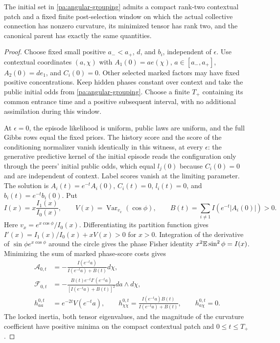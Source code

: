 The initial set in \cref{pa:angular-grouping} admits a compact rank-two contextual patch and a fixed finite post-selection window on which the actual collective connection has nonzero curvature, its minimized tensor has rank two, and the canonical parent has exactly the same quantities.
\begin{proof}
Choose fixed small positive $a_-<a_+$, $d$, and $b_i$, independent of $\epsilon$. Use contextual coordinates $(a,\chi)$ with
$A_1(0)=a e(\chi)$, $a\in[a_-,a_+]$, $A_2(0)=d e_1$, and $C_i(0)=0$.
Other selected marked factors may have fixed positive concentrations. Keep hidden phases constant over context and take the public initial odds from \cref{pa:angular-grouping}. Choose a finite $T_+$ containing its common entrance time and a positive subsequent interval, with no additional assimilation during this window.

At $\epsilon=0$, the episode likelihood is uniform, public laws are uniform, and the full Gibbs rows equal the fixed priors. The history score and the score of the conditioning normalizer vanish identically in this witness, at every $\epsilon$: the generative predictive kernel of the initial episode reads the configuration only through the peers' initial public odds, which equal $l_j(0)$ because $C_i(0)=0$ and are independent of context. Label scores vanish at the limiting parameter. The solution is $A_i(t)=e^{-t}A_i(0)$, $C_i(t)=0$, $l_i(t)=0$, and $b_i(t)=e^{-t}b_i(0)$. Put
\begin{equation}
 I(x)=x\frac{I_1(x)}{I_0(x)},\qquad
 V(x)=\operatorname{Var}_{v_x}(\cos\phi),\qquad
 B(t)=\sum_{i\ne1}I(e^{-t}|A_i(0)|)>0.
 \label{pa:inertias}
\end{equation}
Here $v_x=e^{x\cos\phi}/I_0(x)$. Differentiating its partition function gives $I'(x)=I_1(x)/I_0(x)+xV(x)>0$ for $x>0$. Integration of the derivative of $\sin\phi e^{x\cos\phi}$ around the circle gives the phase Fisher identity $x^2\mathbb E\sin^2\phi=I(x)$. Minimizing the sum of marked phase-score costs gives
\begin{equation}
 \begin{aligned}
 \mathcal A_{0,t}
 &=-\frac{I(e^{-t}a)}{I(e^{-t}a)+B(t)}d\chi,\\
 \mathcal F_{0,t}
 &=-\frac{B(t)e^{-t}I'(e^{-t}a)}
 {[I(e^{-t}a)+B(t)]^2}da\wedge d\chi,\\
 h^{0,t}_{aa}&=e^{-2t}V(e^{-t}a),\qquad
 h^{0,t}_{\chi\chi}=\frac{I(e^{-t}a)B(t)}{I(e^{-t}a)+B(t)},\qquad
 h^{0,t}_{a\chi}=0.
 \end{aligned}
 \label{pa:nonflat-limit}
\end{equation}
The locked inertia, both tensor eigenvalues, and the magnitude of the curvature coefficient have positive minima on the compact contextual patch and $0\leq t\leq T_+$.


\end{proof}
